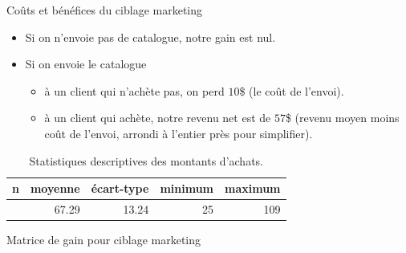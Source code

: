 \documentclass[
  ignorenonframetext,
]{beamer}
\providecommand{\tightlist}{%
  \setlength{\itemsep}{0pt}\setlength{\parskip}{0pt}}\usepackage{longtable,booktabs,array}
\begin{document}
\begin{frame}{Coûts et bénéfices du ciblage marketing}
\label{couxfbts-et-buxe9nuxe9fices-du-ciblage-marketing}
\begin{itemize}
\tightlist
\item
  Si on n'envoie pas de catalogue, notre gain est nul.
\item
  Si on envoie le catalogue

  \begin{itemize}
  \tightlist
  \item
    à un client qui n'achète pas, on perd \(10\)\$ (le coût de l'envoi).
  \item
    à un client qui achète, notre revenu net est de \(57\)\$ (revenu
    moyen moins coût de l'envoi, arrondi à l'entier près pour
    simplifier).
  \end{itemize}
\end{itemize}

\begin{longtable}[]{@{}rrrrr@{}}

\caption{\label{tbl-dbm-ymontant-apprentissage}Statistiques descriptives
des montants d'achats.}

\tabularnewline

\toprule\noalign{}
n & moyenne & écart-type & minimum & maximum \\
\midrule\noalign{}
\endhead
\bottomrule\noalign{}
\endlastfoot
210 & 67.29 & 13.24 & 25 & 109 \\

\end{longtable}
\end{frame}

\begin{frame}{Matrice de gain pour ciblage marketing}
\label{matrice-de-gain-pour-ciblage-marketing}
\begin{table}

\caption{\label{tbl-tableconfumat5}Matrice de gain pour ciblage
marketing.}


\end{table}%
\end{frame}
\end{document}
